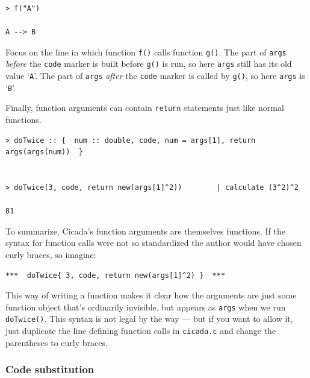 \documentclass{article}
\newenvironment{code}{
       \begin{list}{}{
               \setlength{\leftmargin}{.4in}
               \setlength{\rightmargin}{0in}
               \setlength{\topsep}{.2in}
       }
       \small
       \item[] }
       { \end{list}   }
\begin{document}
\begin{code} \begin{verbatim}
> f("A")

A --> B
\end{verbatim} \end{code}

\noindent Focus on the line in which function \verb#f()# calls function \verb#g()#.  The part of \verb#args# \emph{before} the \verb#code# marker is built before \verb#g()# is run, so here \texttt{args} still has its old value `\texttt{A}'.  The part of \verb#args# \emph{after} the \verb#code# marker is called by \texttt{g()}, so here \texttt{args} is `\texttt{B}'.

Finally, function arguments can contain \verb#return# statements just like normal functions.

\begin{code} \begin{verbatim}
> doTwice :: {  num :: double, code, num = args[1], return args(args(num))  }


> doTwice(3, code, return new(args[1]^2))        | calculate (3^2)^2

81
\end{verbatim} \end{code}

To summarize, Cicada's function arguments are themselves functions.  If the syntax for function calls were not so standardized the author would have chosen curly braces, so imagine:

\begin{code} \begin{verbatim}
***  doTwice{ 3, code, return new(args[1]^2) }  ***
\end{verbatim} \end{code}

\noindent This way of writing a function makes it clear how the arguments are just some function object that's ordinarily invisible, but appears as \verb#args# when we run \verb#doTwice()#.  This syntax is not legal by the way --- but if you want to allow it, just duplicate the line defining function calls in \verb#cicada.c# and change the parentheses to curly braces.

 





\subsubsection{Code substitution}
\end{document}
